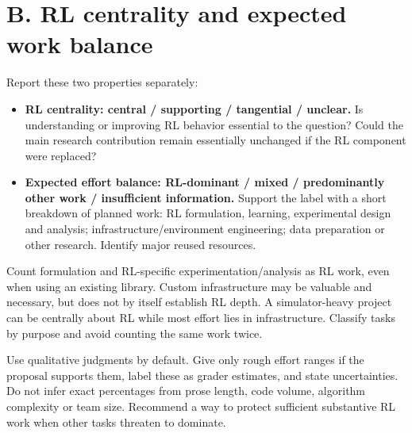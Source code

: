 \documentclass{article}
\begin{document}
\section*{B. RL centrality and expected work balance}
Report these two properties separately:
\begin{itemize}
\item \textbf{RL centrality: central / supporting / tangential / unclear.} Is understanding or improving RL behavior essential to the question? Could the main research contribution remain essentially unchanged if the RL component were replaced?
\item \textbf{Expected effort balance: RL-dominant / mixed / predominantly other work / insufficient information.} Support the label with a short breakdown of planned work: RL formulation, learning, experimental design and analysis; infrastructure/environment engineering; data preparation or other research. Identify major reused resources.
\end{itemize}
Count formulation and RL-specific experimentation/analysis as RL work, even when using an existing library. Custom infrastructure may be valuable and necessary, but does not by itself establish RL depth. A simulator-heavy project can be centrally about RL while most effort lies in infrastructure. Classify tasks by purpose and avoid counting the same work twice.

Use qualitative judgments by default. Give only rough effort ranges if the proposal supports them, label these as grader estimates, and state uncertainties. Do not infer exact percentages from prose length, code volume, algorithm complexity or team size. Recommend a way to protect sufficient substantive RL work when other tasks threaten to dominate.
\end{document}

